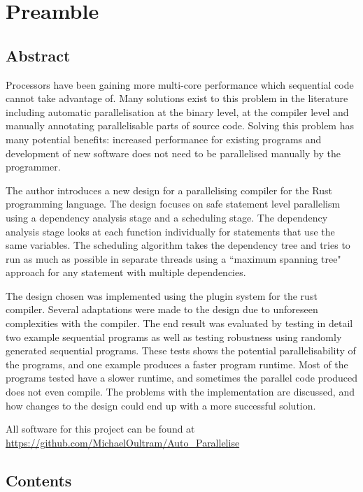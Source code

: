\chapter{Preamble}
\section{Abstract}
Processors have been gaining more multi-core performance which sequential code cannot take advantage of. Many solutions exist to this problem in the literature including automatic parallelisation at the binary level, at the compiler level and manually annotating parallelisable parts of source code. Solving this problem has many potential benefits: increased performance for existing programs and development of new software does not need to be parallelised manually by the programmer.

The author introduces a new design for a parallelising compiler for the Rust programming language. The design focuses on safe statement level parallelism using a dependency analysis stage and a scheduling stage. The dependency analysis stage looks at each function individually for statements that use the same variables. The scheduling algorithm takes the dependency tree and tries to run as much as possible in separate threads using a ``maximum spanning tree" approach for any statement with multiple dependencies.

The design chosen was implemented using the plugin system for the rust compiler. Several adaptations were made to the design due to unforeseen complexities with the compiler. The end result was evaluated by testing in detail two example sequential programs as well as testing robustness using randomly generated sequential programs. These tests shows the potential parallelisability of the programs, and one example produces a faster program runtime. Most of the programs tested have a slower runtime, and sometimes the parallel code produced does not even compile. The problems with the implementation are discussed, and how changes to the design could end up with a more successful solution.

\begin{center}
All software for this project can be found at \\
\url{https://github.com/MichaelOultram/Auto\_Parallelise}
\end{center}

\newpage
\section{Contents}
\makeatletter
\newcommand*{\toccontents}{}
\makeatother
\toccontents
